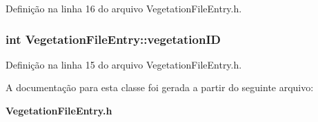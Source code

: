 Definição na linha 16 do arquivo Vegetation\+File\+Entry.\+h.

\subsubsection[{vegetation\+ID}]{\setlength{\rightskip}{0pt plus 5cm}int Vegetation\+File\+Entry\+::vegetation\+ID\hspace{0.3cm}{\ttfamily [protected]}}\label{class_vegetation_file_entry_a726f276fc8f086412b095ff1f74c112c}


Definição na linha 15 do arquivo Vegetation\+File\+Entry.\+h.



A documentação para esta classe foi gerada a partir do seguinte arquivo\+:\begin{DoxyCompactItemize}
\item 
{\bf Vegetation\+File\+Entry.\+h}\end{DoxyCompactItemize}
